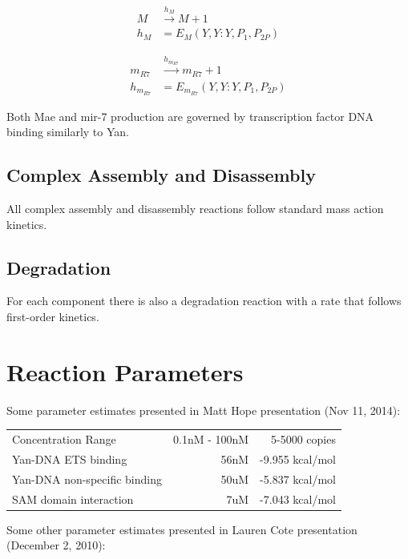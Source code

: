 \documentclass[12pt]{article}
\renewcommand{\(}{\left(}
\renewcommand{\)}{\right)}
\begin{document}
\begin{align}
	M &\xrightarrow{h_M} M + 1 \\
	h_M &= E_M(Y,Y:Y,P_1,P_{2P}) \nonumber
\end{align}

\begin{align}
	m_{R7} &\xrightarrow{h_{m_{R7}}} m_{R7} + 1 \\
	h_{m_{R7}} &= E_{m_{R7}}(Y,Y:Y,P_1,P_{2P}) \nonumber
\end{align}

Both Mae and mir-7 production are governed by transcription factor DNA binding similarly to Yan.

\subsection{Complex Assembly and Disassembly}

All complex assembly and disassembly reactions follow standard mass action kinetics. 

\subsection{Degradation}

For each component there is also a degradation reaction with a rate that follows first-order kinetics. 

\section{Reaction Parameters}

Some parameter estimates presented in Matt Hope presentation (Nov 11, 2014):

\begin{center}
\begin{tabular}{l | r | r}
	\hline
	Concentration Range & 0.1nM - 100nM & 5-5000 copies \\
	Yan-DNA ETS binding & 56nM & -9.955 kcal/mol \\
	Yan-DNA non-specific binding & 50uM & -5.837 kcal/mol \\
	SAM domain interaction & 7uM & -7.043 kcal/mol \\
	\hline
\end{tabular}
\end{center}

Some other parameter estimates presented in Lauren Cote presentation (December 2, 2010):
\end{document}
